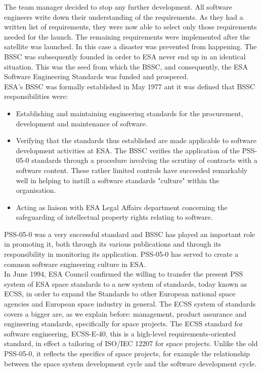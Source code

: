 {The team manager decided to stop any further development. All software engineers write down their understanding of the requirements.
As they had a written list of requirements, they were now able to select only
those requirements needed for the launch. The remaining requirements were implemented after
the satellite was launched. In this case a disaster was prevented from happening\cite{Zwartjes05anagile}.
The \ac{BSSC} was subsequently founded in order to \ac{ESA} never end up in an identical situation. This was the seed from
which the \ac{BSSC}, and consequently, the \ac{ESA} Software Engineering Standards was funded and prospered.\\
\ac{ESA}'s \ac{BSSC} was formally established in May 1977 ant it was defined that \ac{BSSC} responsibilities were:
\begin{itemize}
\item Establishing and maintaining engineering standards for the procurement,
development and maintenance of software.
\item Verifying that the standards thus established are made applicable to software
development activities at \ac{ESA}. The \ac{BSSC} verifies the application of the PSS-05-0\cite{pss-05-0} standards through a procedure involving the
scrutiny of contracts with a software content.
These rather limited controls have succeeded remarkably well in helping to instill a software standards "culture" within the organisation.
\item Acting as liaison with \ac{ESA} Legal Affairs department concerning the safeguarding of intellectual
property rights relating to software.
\end{itemize}
PSS-05-0 was a very successful standard and \ac{BSSC} has played an important role in promoting it, both through its various
publications and through its responsibility in monitoring its application. PSS-05-0 has served to create a common software engineering culture in \ac{ESA}\cite{esa-bulletin-90}.\\
In June 1994, \ac{ESA} Council confirmed the willing to transfer the present PSS system of \ac{ESA} space standards to a new system
of standards, today known as \ac{ECSS}, in order to expand the Standards 
to other European national space agencies and European space industry in general.
The \ac{ECSS} system of standards covers a bigger are, as we explain before: management, product assurance and engineering standards, specifically for space projects.
The \ac{ECSS} standard for software engineering, ECSS-E-40\cite{ecss-e-st-40c}, this is a high-level requirements-oriented standard, in effect a tailoring of ISO/IEC 12207 for space projects.
Unlike the old PSS-05-0, it reflects the specifics of space projects, for example the relationship between the space system development cycle and the software development cycle\cite{esa-bulletin-90}.

}

